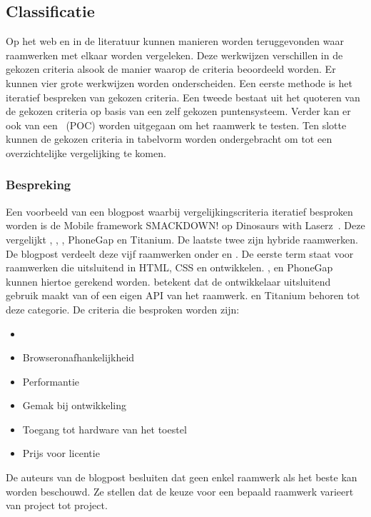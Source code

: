\subsection{Classificatie}
\label{sec:vergelijken-classificatie}
Op het web en in de literatuur kunnen manieren worden teruggevonden waar raamwerken met elkaar worden vergeleken.  
Deze werkwijzen verschillen in de gekozen criteria alsook de manier waarop de criteria beoordeeld worden.
Er kunnen vier grote werkwijzen worden onderscheiden.
Een eerste methode is het iteratief bespreken van gekozen criteria.
Een tweede bestaat uit het quoteren van de gekozen criteria op basis van een zelf gekozen puntensysteem.
Verder kan er ook van een ~(POC) worden uitgegaan om het raamwerk te testen.
Ten slotte kunnen de gekozen criteria in tabelvorm worden ondergebracht om tot een overzichtelijke vergelijking te komen.

\subsubsection{Bespreking}
\label{sec:manier-bespreken}
Een voorbeeld van een blogpost waarbij vergelijkingscriteria iteratief besproken worden is de Mobile framework SMACKDOWN! op Dinosaurs with Laserz~\cite{Rozynski2011}.
Deze vergelijkt \jqt{},  \jqm{},  \st{},  PhoneGap en Titanium.  
De laatste twee zijn hybride raamwerken.
De blogpost verdeelt deze vijf raamwerken onder  en .
De eerste term staat voor raamwerken die uitsluitend in HTML, CSS en \js{} ontwikkelen. 
\jqt{},  \jqm{} en PhoneGap kunnen hiertoe gerekend worden.
 betekent dat de ontwikkelaar uitsluitend gebruik maakt van \js{} of een eigen API van het raamwerk.
\st{} en Titanium behoren tot deze categorie.
De criteria die besproken worden zijn:
\begin{itemize}
 \item {}
 \item Browseronafhankelijkheid
 \item Performantie
 \item Gemak bij ontwikkeling
 \item Toegang tot hardware van het toestel
 \item Prijs voor licentie
\end{itemize}

De auteurs van de blogpost besluiten dat geen enkel raamwerk als het beste kan worden beschouwd.
Ze stellen dat de keuze voor een bepaald raamwerk varieert van project tot project.

